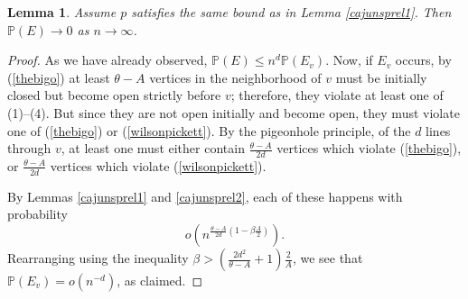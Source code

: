 \documentclass{amsart}
\newcommand{\prob}{\mathbb{P}}
\newcommand{\threshold}{\theta}
\numberwithin{equation}{section}
\newtheorem{lemma}[theorem]{Lemma}
\theoremstyle{definition}
\theoremstyle{remark}
\begin{document}
\begin{lemma} \label{cajuns}
Assume $p$ satisfies the same bound as in Lemma \ref{cajunsprel1}.
Then $\prob(E) \to 0$ as $n \to \infty$.
\end{lemma}
\begin{proof}
As we have already observed, $\prob(E) \le n^d\prob(E_v)$. Now, if $E_v$ occurs, by (\ref{thebigo}) at least $\threshold-A$ vertices in the neighborhood of $v$ must be initially closed but become open strictly before $v$; therefore, they violate at least one of (1)--(4). But since they are not 
open initially and become open, they must violate one of (\ref{thebigo}) or (\ref{wilsonpickett}). By the pigeonhole principle, of the $d$ lines through $v$, at least one must either contain $\frac{\threshold-A}{2d}$ vertices which violate (\ref{thebigo}), or $\frac{\threshold-A}{2d}$ vertices which violate (\ref{wilsonpickett}).

By Lemmas \ref{cajunsprel1}  and \ref{cajunsprel2}, each of these happens with probability 
$$ o\left(  n^{\frac{\threshold-A}{2d}(1-\beta\frac{A}{2})}\right).$$
Rearranging using the inequality $\beta > (\frac{2d^2}{\threshold-A}+1)\frac{2}{A}$, we see that 
$\prob(E_v)=o(n^{-d})$, as claimed.
\end{proof}
 
\end{document}
